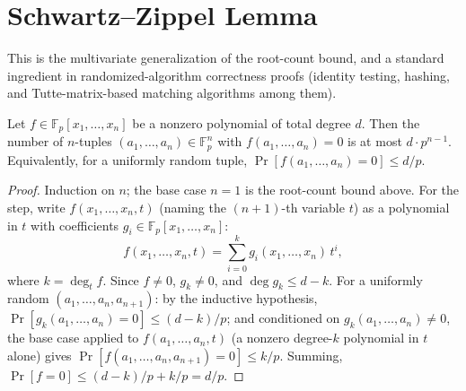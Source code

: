 \documentclass[11pt]{article}
\begin{document}
\section{Schwartz--Zippel Lemma}
This is the multivariate generalization of the root-count bound, and a
standard ingredient in randomized-algorithm correctness proofs (identity
testing, hashing, and Tutte-matrix-based matching algorithms among them).

\begin{theorembox}
Let $f \in \mathbb{F}_p[x_1,\ldots,x_n]$ be a nonzero polynomial of total
degree $d$. Then the number of $n$-tuples $(a_1,\ldots,a_n) \in
\mathbb{F}_p^n$ with $f(a_1,\ldots,a_n)=0$ is at most $d\cdot p^{n-1}$.
Equivalently, for a uniformly random tuple,
$\Pr[f(a_1,\ldots,a_n)=0] \le d/p$.
\end{theorembox}
\begin{proof}
Induction on $n$; the base case $n=1$ is the root-count bound above.
For the step, write $f(x_1,\ldots,x_n,t)$ (naming the $(n{+}1)$-th
variable $t$) as a polynomial in $t$ with coefficients
$g_i \in \mathbb{F}_p[x_1,\ldots,x_n]$:
\[
  f(x_1,\ldots,x_n,t) = \sum_{i=0}^{k} g_i(x_1,\ldots,x_n)\, t^i,
\]
where $k=\deg_t f$. Since $f \ne 0$, $g_k \ne 0$, and $\deg g_k \le d-k$.
For a uniformly random $(a_1,\ldots,a_n,a_{n+1})$: by the inductive
hypothesis, $\Pr[g_k(a_1,\ldots,a_n)=0] \le (d-k)/p$; and conditioned on
$g_k(a_1,\ldots,a_n)\ne 0$, the base case applied to
$f(a_1,\ldots,a_n,t)$ (a nonzero degree-$k$ polynomial in $t$ alone)
gives $\Pr[f(a_1,\ldots,a_n,a_{n+1})=0] \le k/p$. Summing,
$\Pr[f=0] \le (d-k)/p + k/p = d/p$.
\end{proof}
\end{document}
